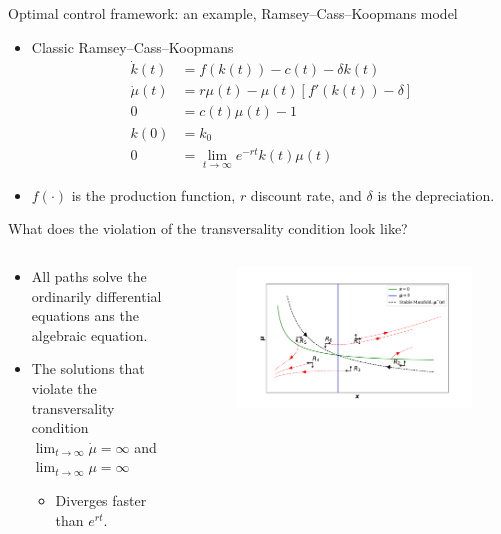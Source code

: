 \documentclass[aspectratio=169,10pt]{beamer}
\begin{document}
\begin{frame}{Optimal control framework: an example, Ramsey–Cass–Koopmans model}
\begin{itemize}
	\item Classic Ramsey–Cass–Koopmans
	\begin{align*}
		\dot{k}(t) &= f\left(k(t)\right) - c(t) - \delta k(t)\\
		\dot{\mu}(t) &= r \mu(t) - \mu(t) \left[f'(k(t)) - \delta \right] \\
		0 &= c(t)\mu(t) - 1\\
		k(0)& = k_0\\
		0 &= \lim_{t\rightarrow \infty} e^{-r t}k(t)\mu(t)
	\end{align*}
\item $f(\cdot)$ is the production function, $r$ discount rate, and $\delta$ is the depreciation.
\end{itemize}
\end{frame}

\begin{frame}{What does the violation of the transversality condition look like?}
	\begin{columns}
		\begin{column}{0.5\textwidth}
			\begin{itemize}
				\item All paths solve the ordinarily differential equations ans the algebraic equation.
				\vspace{0.05in}
				\item The solutions that violate the transversality condition $\lim_{t\rightarrow \infty}{\dot{\mu}} = \infty $ and $\lim_{t\rightarrow \infty}{\mu} = \infty $
				\begin{itemize}
					\item Diverges faster than $e^{rt}$.
				\end{itemize}
			\end{itemize}
		\end{column}
		\begin{column}{0.5\textwidth}
			\begin{figure}[t!]
				\centering
				\includegraphics[width=\textwidth]{figs/phase_diagram_mu_k.pdf}
				\vspace{-7mm}
			\end{figure}
		\end{column}
	\end{columns}
\end{frame}
\end{document}
